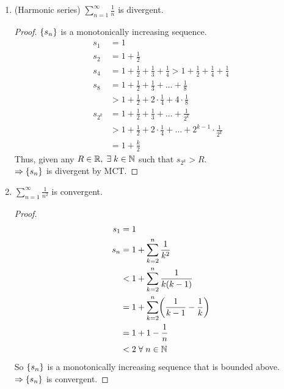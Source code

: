 \documentclass[12pt]{article}
\begin{document}
\begin{example}
    \begin{enumerate}[label=(\alph*)]
        \item (Harmonic series) $\sum_{n=1}^{\infty} \frac{1}{n}$ is divergent.
        \begin{proof}
            $\set{s_{n}}$ is a monotonically increasing sequence.
            \begin{align*}
                s_{1} &= 1 \\
                s_{2} &= 1 + \frac{1}{2} \\
                s_{4} &= 1 + \frac{1}{2} + \frac{1}{3} + \frac{1}{4} > 1 + \frac{1}{2} + \frac{1}{4} + \frac{1}{4} \\
                s_{8} &= 1 + \frac{1}{2} + \frac{1}{3} + \dots + \frac{1}{8} \\
                   &> 1 + \frac{1}{2} + 2 \cdot \frac{1}{4} + 4 \cdot \frac{1}{8} \\
                s_{2^{k}} &= 1 + \frac{1}{2} + \frac{1}{3} + \dots + \frac{1}{2^{k}} \\
                   &> 1 + \frac{1}{2} + 2 \cdot \frac{1}{4} + \dots + 2^{k-1} \cdot \frac{1}{2^{k}} \\
                   &= 1 + \frac{k}{2}
            \end{align*}
            Thus, given any $R \in \mathbb{R}, \;\exists\; k \in \mathbb{N}$ such that $s_{2^{k}} > R$. \\
            $\implies \set{s_{n}}$ is divergent by MCT.
        \end{proof}
        \item $\sum_{n=1}^{\infty} \frac{1}{n^{2}}$ is convergent.
        \begin{proof}
            \begin{align*}
                s_{1} &= 1 \\
                s_{n} &= 1 + \sum_{k=2}^{n} \frac{1}{k^{2}} \\
                &< 1 + \sum_{k=2}^{n} \frac{1}{k(k-1)} \\
                &= 1 + \sum_{k=2}^{n} \paren{\frac{1}{k-1} - \frac{1}{k}} \\
                &= 1 + 1 - \frac{1}{n} \\
                &< 2 \;\forall\; n \in \N
            \end{align*}
            So $\set{s_{n}}$ is a monotonically increasing sequence that is bounded above. \\
            $\implies \set{s_{n}}$ is convergent.
        \end{proof}
    \end{enumerate}
\end{example}
\end{document}
